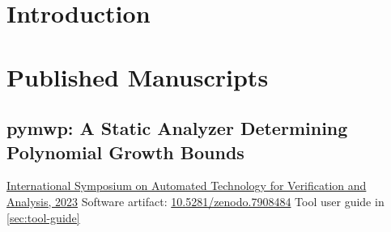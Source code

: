 \documentclass[letterpaper,11pt]{report}
\title{\EDSTITLE}
\author{\EDSAUTHOR}
\date{\today}
\begin{document}
\maketitle\clearpage
\clearpage
\clearpage
\tableofcontents\clearpage
\listoftables\clearpage
\listoffigures\clearpage

\setcounter{chapter}{0}
\chapter{Introduction}\label{ch:introduction}


\chapter{Published Manuscripts}\label{ch:published-manuscripts}\clearpage

\section{pymwp: A Static Analyzer Determining Polynomial Growth Bounds}\label{sec:atva}

{\href{https://atva-conference.org/2023}{International Symposium on Automated Technology for Verification and Analysis, 2023}}
{\noindent Software artifact: \href{https://doi.org/10.5281/zenodo.7908484}{10.5281/zenodo.7908484}
\newline\noindent Tool user guide in \autoref{sec:tool-guide}}



\end{document}
